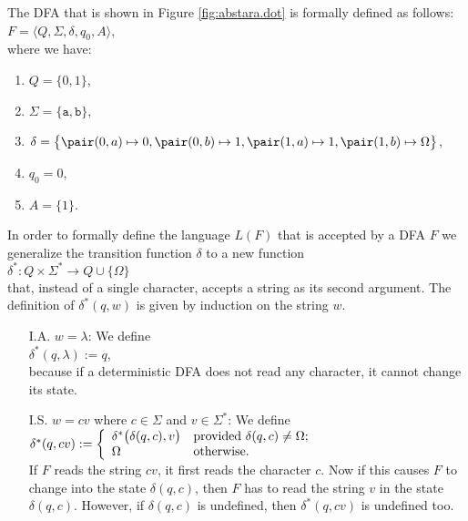 \exampleEng
The \textsc{DFA} that is shown in Figure  \ref{fig:abstara.dot} is formally defined as follows:
\\[0.2cm]
\hspace*{1.3cm}
$F = \langle Q, \Sigma, \delta, q_0, A \rangle$,
\\[0.2cm]
where we have:
\begin{enumerate}
\item $Q = \{ 0, 1 \}$,
\item $\Sigma = \{ \texttt{a}, \texttt{b} \}$,
\item $\delta = \bigl\{ 
                        \pair(0,a) \mapsto 0, 
                        \pair(0,b) \mapsto 1, 
                        \pair(1,a) \mapsto 1, 
                        \pair(1,b) \mapsto \Omega 
                \bigr\}$,
\item $q_0 = 0$,
\item $A = \{ 1 \}$.
\end{enumerate}
In order to formally define the language $L(F)$ that is accepted by a \textsc{DFA} $F$
we generalize the transition function $\delta$ to a new function
\\[0.2cm]
\hspace*{1.3cm}
$\delta^*: Q \times \Sigma^* \rightarrow Q \cup \{ \Omega \}$
\\[0.2cm]
that, instead of a single character, accepts a string as its second argument.  The definition of
$\delta^*(q, w)$ is given by induction on the string $w$.
\begin{enumerate}
\item[I.A.] $w = \lambda$:  We define
            \\[0.2cm]
            \hspace*{1.3cm}
            $\delta^*(q, \lambda) := q$,
            \\[0.2cm]
            because if a deterministic \textsc{DFA} does not read any character, it cannot change its state. 
\item[I.S.] $w = cv$ where $c \in \Sigma$ and $v  \in \Sigma^*$:  We define
            \\[0.2cm]
            \hspace*{1.3cm}
            $\delta^*(q, cv) := \left\{
            \begin{array}[c]{ll}              
            \delta^*\bigl(\delta(q,c),v\bigr) & \mbox{provided $\delta(q,c) \not= \Omega$;} \\
            \Omega                            & \mbox{otherwise}.
            \end{array}
            \right.
            $
            \\[0.2cm]
            If $F$ reads the string  $cv$, it first reads the character $c$.  Now if this causes  $F$
            to change into the state $\delta(q,c)$, then $F$ has to read the string $v$ in the state
            $\delta(q,c)$.  However, 
            if  $\delta(q,c)$ is undefined, then  $\delta^*(q,cv)$ is undefined too.
\end{enumerate}

